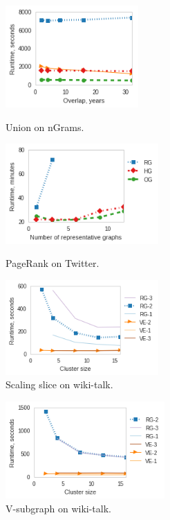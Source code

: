 \begin{figure}
\centering
\begin{minipage}[b]{2in}
\centering
\includegraphics[width=2in]{figs/union_ngrams_build13.png}
\caption{Union on nGrams.}
\label{fig:union2}
\end{minipage}
\begin{minipage}[b]{2.3in}
\centering
\includegraphics[width=2.3in]{figs/prank_twitter_build13.png}
\caption{PageRank on Twitter.}
\label{fig:pranktwitter}
\end{minipage}
\begin{minipage}[b]{2.3in}
\centering
\includegraphics[width=2.3in]{figs/slice_wikitalk_scale_build13.png}
\caption{Scaling slice on wiki-talk.}
\label{fig:slicescale}
\end{minipage}
\end{figure}

\begin{figure}
\centering
\begin{minipage}{2.4in}
\includegraphics[width=2.4in]{figs/select_wikitalk_scale_build13.png}
\caption{V-subgraph on wiki-talk.}
\label{fig:selectscale}
\end{minipage}
\end{figure}

